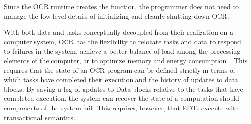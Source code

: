 %
Since the OCR runtime creates the 
function, the programmer does not need to manage the low level
details of initializing and cleanly shutting down OCR.
%


With both data and tasks conceptually decoupled from their realization
on a computer system, OCR has the flexibility to relocate tasks and data
to respond to failures in the system, achieve a better balance of load
among the processing elements of the computer, or to optimize memory
and energy consumption~\cite{GZCS10,Guo10,CTBCCGYS13,SbBS14}.
This requires that the state of an OCR program can be defined
strictly in terms of which tasks have completed their execution
and the history of updates to data blocks. By saving a log of updates to Data blocks
relative to the tasks that have completed execution, the system can recover
the state of a computation should components of the system fail. This requires,
however, that EDTs execute with transactional semantics.

